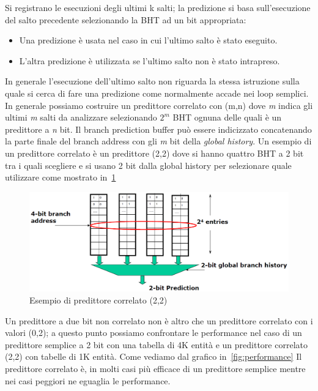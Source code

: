 Si registrano le esecuzioni degli ultimi k salti; la predizione si basa sull'esecuzione del salto precedente selezionando la BHT ad un bit appropriata:
\begin{itemize}
\item Una predizione è usata nel caso in cui l'ultimo salto è stato eseguito.
\item L'altra predizione è utilizzata se l'ultimo salto non è stato intrapreso.
\end{itemize}
In generale l'esecuzione dell'ultimo salto non riguarda la stessa istruzione sulla quale si cerca di fare una predizione come normalmente accade nei loop semplici.\\
In generale possiamo costruire un predittore correlato con (m,n) dove \emph{m} indica gli ultimi \emph{m} salti da analizzare selezionando $2^m$ BHT ognuna delle quali è un predittore a \emph{n} bit.
Il branch prediction buffer può essere indicizzato concatenando la parte finale del branch address con gli \emph{m} bit della \emph{global history}.
Un esempio di un predittore correlato è un predittore (2,2) dove si hanno quattro BHT a 2 bit tra i quali scegliere e si usano 2 bit dalla global history per selezionare quale utilizzare come mostrato in \figurename\,\ref{fig:22correlato}
\begin{figure}[htb]
\centering
\includegraphics[scale=0.5]{img/22correlato.png}
\caption{Esempio di predittore correlato (2,2)}\label{fig:22correlato}
\end{figure}
Un predittore a due bit non correlato non è altro che un predittore correlato con i valori (0,2); a questo punto possiamo confrontare le performance nel caso di un predittore semplice a 2 bit con una tabella di 4K entità e un predittore correlato (2,2) con tabelle di 1K entità. Come vediamo dal grafico in \figurename\,\ref{fig:performance}
Il predittore correlato è, in molti casi più efficace di un predittore semplice mentre nei casi peggiori ne eguaglia le performance.
